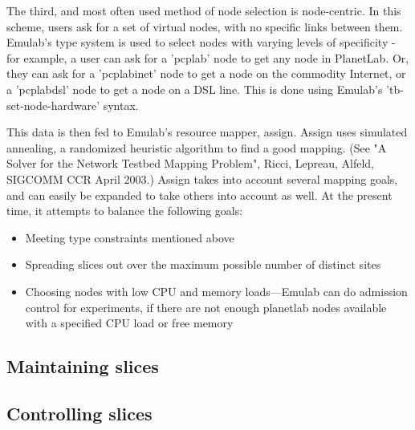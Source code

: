 The third, and most often used method of node selection is node-centric. In
this scheme, users ask for a set of virtual nodes, with no specific links
between them. Emulab's type system is used to select nodes with varying levels
of specificity - for example, a user can ask for a 'pcplab' node to get any
node in PlanetLab.  Or, they can ask for a 'pcplabinet' node to get a node on
the commodity Internet, or a 'pcplabdsl' node to get a node on a DSL line.
This is done using Emulab's 'tb-set-node-hardware' syntax.

This data is then fed to Emulab's resource mapper, assign. Assign uses
simulated annealing, a randomized heuristic algorithm to find a good mapping.
(See "A Solver for the Network Testbed Mapping Problem", Ricci, Lepreau,
Alfeld, SIGCOMM CCR April 2003.) Assign takes into account several mapping
goals, and can easily be expanded to take others into account as well.  At the
present time, it attempts to balance the following goals:

\begin{itemize}
\item Meeting type constraints mentioned above
\item Spreading slices out over the maximum possible number of distinct sites
\item Choosing nodes with low CPU and memory loads---Emulab can do admission
    control for experiments, if there are not enough planetlab nodes available
    with a specified CPU load or free memory
\end{itemize}

\subsection{Maintaining slices}

\subsection{Controlling slices}
